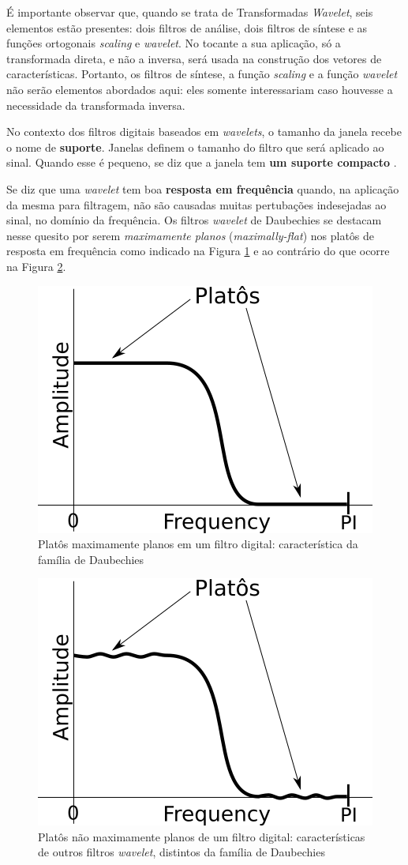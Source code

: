 			\par É importante observar que, quando se trata de Transformadas \textit{Wavelet}, seis elementos estão presentes: dois filtros de análise, dois filtros de síntese e as funções ortogonais \textit{scaling} e \textit{wavelet}. No tocante a sua aplicação, só a transformada direta, e não a inversa, será usada na construção dos vetores de características. Portanto, os filtros de síntese, a função \textit{scaling} e a função \textit{wavelet} não serão elementos abordados aqui: eles somente interessariam caso houvesse a necessidade da transformada inversa.

			\par No contexto dos filtros digitais baseados em \textit{wavelets}, o tamanho da janela recebe o nome de \textbf{suporte}. Janelas definem o tamanho do filtro que será aplicado ao sinal. Quando esse é pequeno, se diz que a janela tem \textbf{um suporte compacto} \cite{robi2003}.
		
			\par Se diz que uma \textit{wavelet} tem boa \textbf{resposta em frequência} quando, na aplicação da mesma para filtragem, não são causadas muitas pertubações indesejadas ao sinal, no domínio da frequência. Os filtros \textit{wavelet} de Daubechies se destacam nesse quesito por serem \textit{maximamente planos} (\textit{maximally-flat}) nos platôs de resposta em frequência como indicado na Figura \ref{fig:daubechies} e ao contrário do que ocorre na Figura \ref{fig:nomaximallyflat}.

			\begin{figure}[h]
				\centering
				\includegraphics[width=0.3\linewidth]{images/daubechies}
				\caption{Platôs maximamente planos em um filtro digital: característica da família de Daubechies}
				\label{fig:daubechies}
			\end{figure}

			\begin{figure}[h]
				\centering
				\includegraphics[width=0.3\linewidth]{images/noMaximallyFlat}
				\caption{Platôs não maximamente planos de um filtro digital: características de outros filtros \textit{wavelet}, distintos da família de Daubechies}
				\label{fig:nomaximallyflat}
			\end{figure}
		
